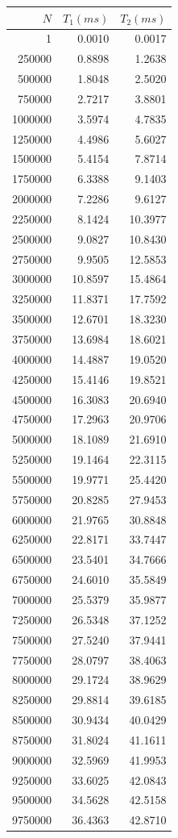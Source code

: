 \begin{table}
					
	\centering
	\begin{tabular}{|r|r|r|}
        \hline
        $N$ & $T_1 (ms)$ & $T_2 (ms)$ \\
        \hline
		1 & 0.0010 & 0.0017 \\ 
		250000 & 0.8898 & 1.2638 \\ 
		500000 & 1.8048 & 2.5020 \\ 
		750000 & 2.7217 & 3.8801 \\ 
		1000000 & 3.5974 & 4.7835 \\ 
		1250000 & 4.4986 & 5.6027 \\ 
		1500000 & 5.4154 & 7.8714 \\ 
		1750000 & 6.3388 & 9.1403 \\ 
		2000000 & 7.2286 & 9.6127 \\ 
		2250000 & 8.1424 & 10.3977 \\ 
		2500000 & 9.0827 & 10.8430 \\ 
		2750000 & 9.9505 & 12.5853 \\ 
		3000000 & 10.8597 & 15.4864 \\ 
		3250000 & 11.8371 & 17.7592 \\ 
		3500000 & 12.6701 & 18.3230 \\ 
		3750000 & 13.6984 & 18.6021 \\ 
		4000000 & 14.4887 & 19.0520 \\ 
		4250000 & 15.4146 & 19.8521 \\ 
		4500000 & 16.3083 & 20.6940 \\ 
		4750000 & 17.2963 & 20.9706 \\ 
		5000000 & 18.1089 & 21.6910 \\ 
		5250000 & 19.1464 & 22.3115 \\ 
		5500000 & 19.9771 & 25.4420 \\ 
		5750000 & 20.8285 & 27.9453 \\ 
		6000000 & 21.9765 & 30.8848 \\ 
		6250000 & 22.8171 & 33.7447 \\ 
		6500000 & 23.5401 & 34.7666 \\ 
		6750000 & 24.6010 & 35.5849 \\ 
		7000000 & 25.5379 & 35.9877 \\ 
		7250000 & 26.5348 & 37.1252 \\ 
		7500000 & 27.5240 & 37.9441 \\ 
		7750000 & 28.0797 & 38.4063 \\ 
		8000000 & 29.1724 & 38.9629 \\ 
		8250000 & 29.8814 & 39.6185 \\ 
		8500000 & 30.9434 & 40.0429 \\ 
		8750000 & 31.8024 & 41.1611 \\ 
		9000000 & 32.5969 & 41.9953 \\ 
		9250000 & 33.6025 & 42.0843 \\ 
		9500000 & 34.5628 & 42.5158 \\ 
		9750000 & 36.4363 & 42.8710 \\
        \hline 
	\end{tabular}


\end{table}

